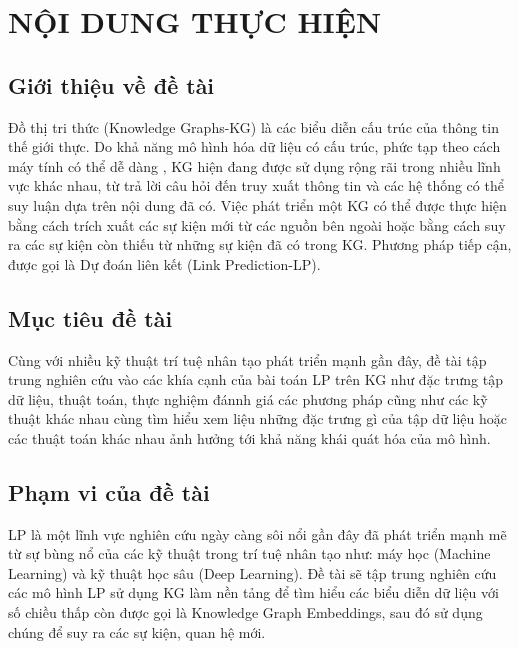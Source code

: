 \documentclass{article}[14pt]
\begin{document}
    \section{NỘI DUNG THỰC HIỆN}
    {

    
    \subsection{Giới thiệu về đề tài}
    
    Đồ thị tri thức (Knowledge Graphs-KG) là các biểu diễn cấu trúc của thông tin thế giới thực. Do khả năng mô hình hóa dữ liệu có cấu trúc, phức tạp theo cách máy tính có thể dễ dàng , KG hiện đang được sử dụng rộng rãi trong nhiều lĩnh vực khác nhau, từ trả lời câu hỏi đến truy xuất thông tin và các hệ thống có thể suy luận dựa trên nội dung đã có.
    Việc phát triển một KG có thể được thực hiện bằng cách trích xuất các sự kiện mới từ các nguồn bên ngoài hoặc bằng cách suy ra các sự kiện còn thiếu từ những sự kiện đã có trong KG. Phương pháp tiếp cận, được gọi là Dự đoán liên kết (Link Prediction-LP).
    
    \subsection{Mục tiêu đề tài}
    Cùng với nhiều kỹ thuật trí tuệ nhân tạo phát triển mạnh gần đây, đề tài tập trung nghiên cứu vào các khía cạnh của bài toán LP trên KG như đặc trưng tập dữ liệu, thuật toán, thực nghiệm đánnh giá các phương pháp cũng như các kỹ thuật khác nhau cùng tìm hiểu xem liệu những đặc trưng gì của tập dữ liệu hoặc các thuật toán khác nhau ảnh hưởng tới khả năng khái quát hóa của mô hình.
    \subsection{Phạm vi của đề tài}
    LP là một lĩnh vực nghiên cứu ngày càng sôi nổi gần đây đã phát triển mạnh mẽ từ sự bùng nổ của các kỹ thuật trong trí tuệ nhân tạo như: máy học (Machine Learning) và kỹ thuật học sâu (Deep Learning). Đề tài sẽ tập trung nghiên cứu các mô hình LP sử dụng KG làm nền tảng để tìm hiểu các biểu diễn dữ liệu với số chiều thấp còn được gọi là Knowledge Graph Embeddings, sau đó sử dụng chúng để suy ra các sự kiện, quan hệ mới.
    
}
\end{document}
